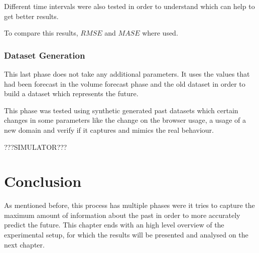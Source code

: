 Different time intervals were also tested in order to understand which can help
to get better results.

To compare this results, $RMSE$ and $MASE$ where used.

\subsubsection*{Dataset Generation}

This last phase does not take any additional parameters. It uses the values
that had been forecast in the volume forecast phase and the old dataset in order to build
a dataset which represents the future.

This phase was tested using synthetic generated past datasets which certain
changes in some parameters like the change on the browser usage, a usage of a
new domain and verify if it captures and mimics the real behaviour.

???SIMULATOR???

\section{Conclusion}

As mentioned before, this process has multiple phases were it tries to capture the
maximum amount of information about the past in order to more accurately predict
the future.
This chapter ends with an high level overview of the experimental setup, for which
the results will be presented and analysed on the next chapter.

